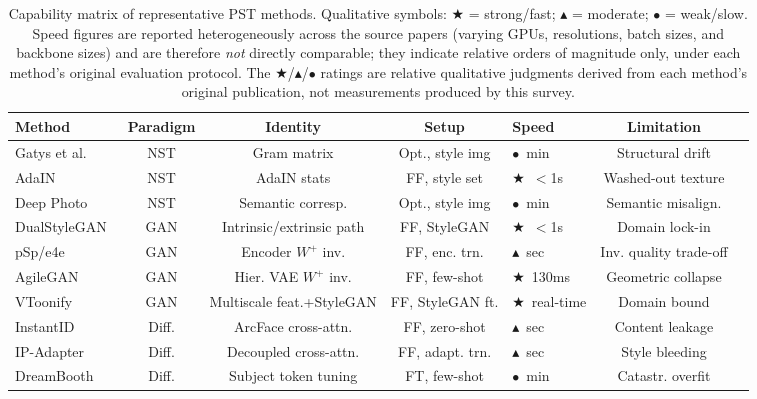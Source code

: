 \documentclass[journal]{IEEEtran}
\begin{document}
\begin{table}[t]
\centering
\caption{Capability matrix of representative PST methods. Qualitative symbols: $\bigstar$ = strong/fast; $\blacktriangle$ = moderate; $\bullet$ = weak/slow. Speed figures are reported heterogeneously across the source papers (varying GPUs, resolutions, batch sizes, and backbone sizes) and are therefore \textit{not} directly comparable; they indicate relative orders of magnitude only, under each method's original evaluation protocol. The $\bigstar$/$\blacktriangle$/$\bullet$ ratings are relative qualitative judgments derived from each method's original publication, not measurements produced by this survey.}
\label{tab:comparison_matrix}
\small
\setlength{\tabcolsep}{3.5pt}
\begin{tabular}{lcccp{1.8cm}cl}
\toprule
\textbf{Method} & \textbf{Paradigm} & \textbf{Identity} & \textbf{Setup} & \textbf{Speed} & \textbf{Limitation} \\
\midrule
Gatys et al.~\cite{gatys2015ana} & NST & Gram matrix & Opt., style img & $\bullet$~min & Structural drift \\
AdaIN~\cite{huang2017arbitraryst} & NST & AdaIN stats & FF, style set & $\bigstar$~$<$1s & Washed-out texture \\
Deep Photo~\cite{luan2017deepps} & NST & Semantic corresp. & Opt., style img & $\bullet$~min & Semantic misalign. \\
\midrule
DualStyleGAN~\cite{yang2022dualstylegan} & GAN & Intrinsic/extrinsic path & FF, StyleGAN & $\bigstar$~$<$1s & Domain lock-in \\
pSp/e4e~\cite{richardson2021encoding} & GAN & Encoder $W^+$ inv. & FF, enc. trn. & $\blacktriangle$~sec & Inv. quality trade-off \\
AgileGAN~\cite{song2021agilegan} & GAN & Hier. VAE $W^+$ inv. & FF, few-shot & $\bigstar$~130ms & Geometric collapse \\
VToonify~\cite{yang2022vtoonify} & GAN & Multiscale feat.+StyleGAN & FF, StyleGAN ft. & $\bigstar$~real-time & Domain bound \\
\midrule
InstantID~\cite{wang2024instantid} & Diff. & ArcFace cross-attn. & FF, zero-shot & $\blacktriangle$~sec & Content leakage \\
IP-Adapter~\cite{ye2023ipadapter} & Diff. & Decoupled cross-attn. & FF, adapt. trn. & $\blacktriangle$~sec & Style bleeding \\
DreamBooth~\cite{ruiz2023dreambooth} & Diff. & Subject token tuning & FT, few-shot & $\bullet$~min & Catastr. overfit \\

\end{tabular}
\end{table}
\end{document}
